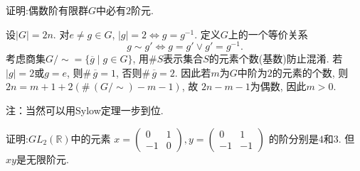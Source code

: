 \begin{problem}
    证明:偶数阶有限群$G$中必有$2$阶元.
\end{problem}

\begin{solution}
    设$|G| = 2n$. 对$e \neq g \in G$, $|g| = 2 \iff g = g^{-1}$.
定义$G$上的一个等价关系
\[
    g \sim g' \iff g = g' \lor g' = g^{-1}.
\]
考虑商集$G/\sim = \{\overline{g} \mid g \in G\}$,
用$\#S$表示集合$S$的元素个数(基数)防止混淆.
若$|g| = 2$或$g = e$, 则$\#\, \overline{g} = 1$, 否则$\#\, \overline{g} = 2$.
因此若$m$为$G$中阶为$2$的元素的个数, 则$2n = m + 1 + 2(\#\, (G/\sim) - m - 1)$, 故
$2n - m - 1$为偶数, 因此$m > 0$.    

注：当然可以用Sylow定理一步到位.
\end{solution}

\begin{problem}
    证明:$GL_2(\mathbb{R})$中的元素
\(
x = \begin{pmatrix}
        0 & 1\\
        -1 & 0
\end{pmatrix}, 
y = \begin{pmatrix}
        0 & 1\\
        -1 & -1
\end{pmatrix}
\)
的阶分别是$4$和$3$. 但$xy$是无限阶元.
\end{problem}


